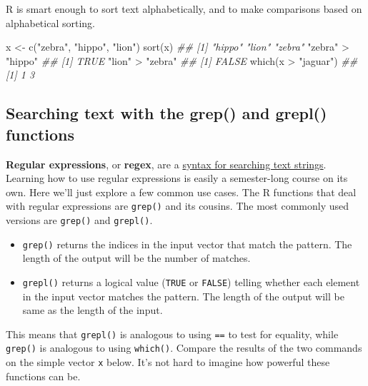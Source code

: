 \documentclass[
  13,
  letterpaper,
]{report}
\newenvironment{Shaded}{\begin{snugshade}}{\end{snugshade}}
\newcommand{\DocumentationTok}[1]{\textcolor[rgb]{0.37,0.37,0.37}{\textit{#1}}}
\newcommand{\FunctionTok}[1]{\textcolor[rgb]{0.28,0.35,0.67}{#1}}
\newcommand{\NormalTok}[1]{\textcolor[rgb]{0.00,0.23,0.31}{#1}}
\newcommand{\OtherTok}[1]{\textcolor[rgb]{0.00,0.23,0.31}{#1}}
\newcommand{\SpecialCharTok}[1]{\textcolor[rgb]{0.37,0.37,0.37}{#1}}
\newcommand{\StringTok}[1]{\textcolor[rgb]{0.13,0.47,0.30}{#1}}
\providecommand{\tightlist}{%
  \setlength{\itemsep}{0pt}\setlength{\parskip}{0pt}}
\begin{document}
R is smart enough to sort text alphabetically, and to make comparisons
based on alphabetical sorting.

\begin{Shaded}
\begin{Highlighting}[]

\NormalTok{x }\OtherTok{\textless{}{-}} \FunctionTok{c}\NormalTok{(}\StringTok{"zebra"}\NormalTok{, }\StringTok{"hippo"}\NormalTok{, }\StringTok{"lion"}\NormalTok{)}
\FunctionTok{sort}\NormalTok{(x)}
\DocumentationTok{\#\# [1] "hippo" "lion"  "zebra"}
\StringTok{"zebra"} \SpecialCharTok{\textgreater{}} \StringTok{"hippo"}
\DocumentationTok{\#\# [1] TRUE}
\StringTok{"lion"} \SpecialCharTok{\textgreater{}} \StringTok{"zebra"}
\DocumentationTok{\#\# [1] FALSE}
\FunctionTok{which}\NormalTok{(x }\SpecialCharTok{\textgreater{}} \StringTok{"jaguar"}\NormalTok{)}
\DocumentationTok{\#\# [1] 1 3}
\end{Highlighting}
\end{Shaded}

\subsection{Searching text with the grep() and grepl()
functions}\label{sec-manip-char-grep}

\textbf{Regular expressions}, or \textbf{regex}, are a
\href{https://en.wikipedia.org/wiki/Regular_expression}{syntax for
searching text strings}. Learning how to use regular expressions is
easily a semester-long course on its own. Here we'll just explore a few
common use cases. The R functions that deal with regular expressions are
\texttt{grep()} and its cousins. The most commonly used versions are
\texttt{grep()} and \texttt{grepl()}.

\begin{itemize}
\tightlist
\item
  \texttt{grep()} returns the indices in the input vector that match the
  pattern. The length of the output will be the number of matches.
\item
  \texttt{grepl()} returns a logical value (\texttt{TRUE} or
  \texttt{FALSE}) telling whether each element in the input vector
  matches the pattern. The length of the output will be same as the
  length of the input.
\end{itemize}

This means that \texttt{grepl()} is analogous to using \texttt{==} to
test for equality, while \texttt{grep()} is analogous to using
\texttt{which()}. Compare the results of the two commands on the simple
vector \texttt{x} below. It's not hard to imagine how powerful these
functions can be.
\end{document}
